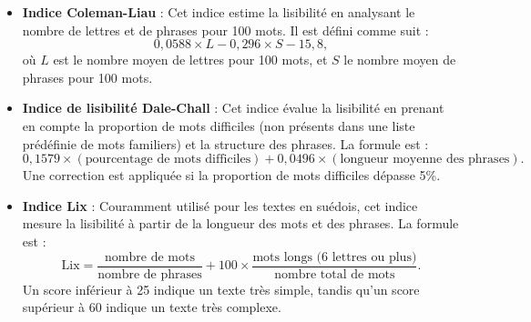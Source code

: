 \documentclass[12pt,a4paper,oneside,titlepage]{book} %
\begin{document}
\begin{itemize}
\item \textbf{Indice Coleman-Liau} : Cet indice estime la lisibilité en analysant le nombre de lettres et de phrases pour 100 mots. Il est défini comme suit :
\[
0{,}0588 \times L - 0{,}296 \times S - 15{,}8,
\]
où \( L \) est le nombre moyen de lettres pour 100 mots, et \( S \) le nombre moyen de phrases pour 100 mots.

\item \textbf{Indice de lisibilité Dale-Chall} : Cet indice évalue la lisibilité en prenant en compte la proportion de mots difficiles (non présents dans une liste prédéfinie de mots familiers) et la structure des phrases. La formule est :
\[
0{,}1579 \times \left( \text{pourcentage de mots difficiles} \right) + 0{,}0496 \times \left( \text{longueur moyenne des phrases} \right).
\]
Une correction est appliquée si la proportion de mots difficiles dépasse 5\%.

\item \textbf{Indice Lix} : Couramment utilisé pour les textes en suédois, cet indice mesure la lisibilité à partir de la longueur des mots et des phrases. La formule est :
\[
\text{Lix} = \frac{\text{nombre de mots}}{\text{nombre de phrases}} + 100 \times \frac{\text{mots longs (6 lettres ou plus)}}{\text{nombre total de mots}}.
\]
Un score inférieur à 25 indique un texte très simple, tandis qu’un score supérieur à 60 indique un texte très complexe.


\end{itemize}	


	
\end{document}
